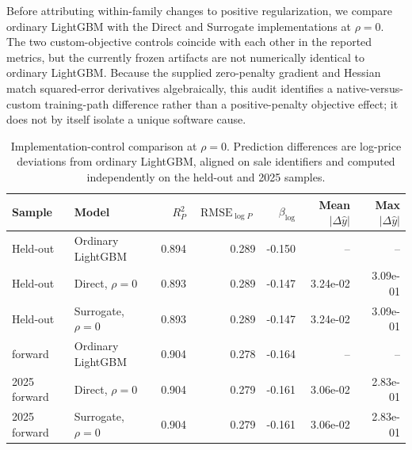 \documentclass[10pt]{article}
\theoremstyle{definition}
\newcommand{\1}{\mathbf{1}}
\newcommand{\newtext}[1]{\textcolor{impGreen}{#1}}
\begin{document}
\newtext{Before attributing within-family changes to positive regularization, we compare ordinary LightGBM with the Direct and Surrogate implementations at $\rho=0$. The two custom-objective controls coincide with each other in the reported metrics, but the currently frozen artifacts are not numerically identical to ordinary LightGBM. Because the supplied zero-penalty gradient and Hessian match squared-error derivatives algebraically, this audit identifies a native-versus-custom training-path difference rather than a positive-penalty objective effect; it does not by itself isolate a unique software cause.}

{\color{impGreen}
\begin{table}[!ht]
\centering
\caption{Implementation-control comparison at $\rho=0$. Prediction differences are log-price deviations from ordinary LightGBM, aligned on sale identifiers and computed independently on the held-out and 2025 samples.}
\label{tab:rho_zero_control}
\begin{tabular}{llrrrrr}
\toprule
Sample & Model & $R^2_P$ & $\operatorname{RMSE}_{\log P}$ & $\beta_{\log}$ & Mean $|\Delta\widehat y|$ & Max $|\Delta\widehat y|$ \\
\midrule
Held-out & Ordinary LightGBM & 0.894 & 0.289 & -0.150 & -- & -- \\
Held-out & Direct, $\rho=0$ & 0.893 & 0.289 & -0.147 & 3.24e-02 & 3.09e-01 \\
Held-out & Surrogate, $\rho=0$ & 0.893 & 0.289 & -0.147 & 3.24e-02 & 3.09e-01 \\
\addlinespace
2025 forward & Ordinary LightGBM & 0.904 & 0.278 & -0.164 & -- & -- \\
2025 forward & Direct, $\rho=0$ & 0.904 & 0.279 & -0.161 & 3.06e-02 & 2.83e-01 \\
2025 forward & Surrogate, $\rho=0$ & 0.904 & 0.279 & -0.161 & 3.06e-02 & 2.83e-01 \\
\bottomrule
\end{tabular}
\end{table}
}

\end{document}
